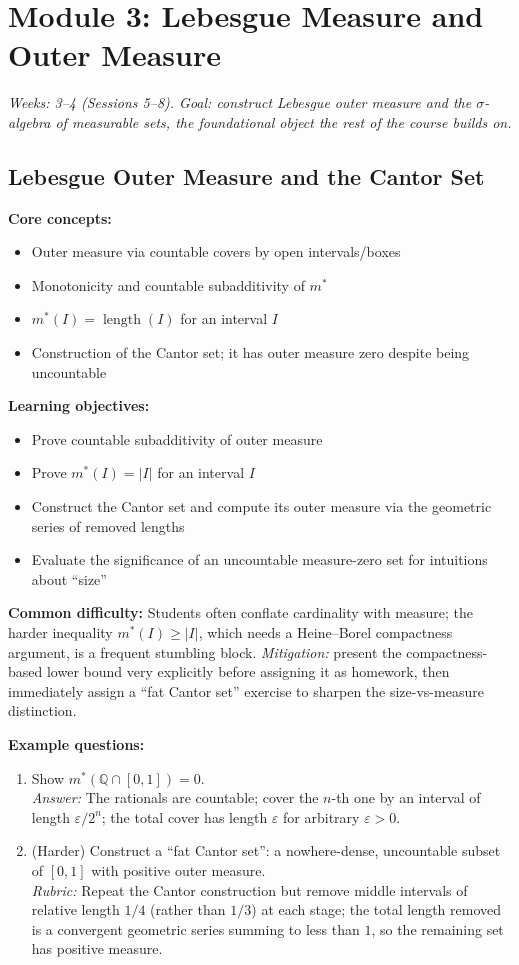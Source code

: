\documentclass[11pt]{article}
\begin{document}
\section{Module 3: Lebesgue Measure and Outer Measure}
\textit{Weeks: 3--4 (Sessions 5--8). Goal: construct Lebesgue outer measure and the $\sigma$-algebra of measurable sets, the foundational object the rest of the course builds on.}

\subsection{Lebesgue Outer Measure and the Cantor Set}

\textbf{Core concepts:}
\begin{itemize}[nosep]
\item Outer measure via countable covers by open intervals/boxes
\item Monotonicity and countable subadditivity of $m^*$
\item $m^*(I)=\operatorname{length}(I)$ for an interval $I$
\item Construction of the Cantor set; it has outer measure zero despite being uncountable
\end{itemize}

\textbf{Learning objectives:}
\begin{itemize}[nosep]
\item Prove countable subadditivity of outer measure
\item Prove $m^*(I)=|I|$ for an interval $I$
\item Construct the Cantor set and compute its outer measure via the geometric series of removed lengths
\item Evaluate the significance of an uncountable measure-zero set for intuitions about ``size''
\end{itemize}

\textbf{Common difficulty:} Students often conflate cardinality with measure; the harder inequality $m^*(I)\ge|I|$, which needs a Heine--Borel compactness argument, is a frequent stumbling block. \textit{Mitigation:} present the compactness-based lower bound very explicitly before assigning it as homework, then immediately assign a ``fat Cantor set'' exercise to sharpen the size-vs-measure distinction.

\textbf{Example questions:}
\begin{enumerate}[nosep]
\item Show $m^*(\mathbb{Q}\cap[0,1])=0$. \\
\textit{Answer:} The rationals are countable; cover the $n$-th one by an interval of length $\varepsilon/2^n$; the total cover has length $\varepsilon$ for arbitrary $\varepsilon>0$.
\item (Harder) Construct a ``fat Cantor set'': a nowhere-dense, uncountable subset of $[0,1]$ with positive outer measure. \\
\textit{Rubric:} Repeat the Cantor construction but remove middle intervals of relative length $1/4$ (rather than $1/3$) at each stage; the total length removed is a convergent geometric series summing to less than $1$, so the remaining set has positive measure.
\end{enumerate}
\end{document}
